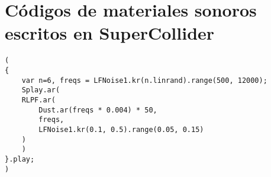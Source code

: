 \section{Códigos de materiales sonoros escritos en SuperCollider}
\label{sec:materiales_supercollider}





\begin{minipage}[t]{1\textwidth}
    \centering
    \begin{lstlisting}[style=SuperCollider-IDE, basicstyle=\footnotesize\ttfamily, numbers=none]
(
{
    var n=6, freqs = LFNoise1.kr(n.linrand).range(500, 12000);
    Splay.ar(
    RLPF.ar(
        Dust.ar(freqs * 0.004) * 50,
        freqs,
        LFNoise1.kr(0.1, 0.5).range(0.05, 0.15)
    )
    )
}.play;
)                                          
    \end{lstlisting}
    \vspace{1cm}
\end{minipage}



























